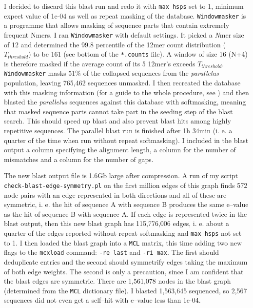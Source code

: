 \documentclass{article}\usepackage[]{graphicx}\usepackage[]{color}
\begin{document}
I decided to discard this blast run and redo it with \texttt{max\_hsps} set to 1, minimum expect value of 1e-04 as well as repeat masking of the database. \texttt{Windowmasker} \citep{Morgulis2006a} is a programme that allows masking of sequence parts that contain extremely frequent \glspl{Nmer}. I ran \texttt{Windowmasker} with default settings. It picked a \emph{N}mer size of 12 and determined the 99.8 percentile of the 12mer count distribution ($T_{threshold}$) to be 161 (see bottom of the \texttt{*.counts} file). A window of size 16 (N+4) is therefore masked if the average count of its 5 12mer's exceeds  $T_{threshold}$. \texttt{Windowmasker} masks 51\% of the collapsed sequences from the \textit{parallelus} population, leaving 765,462 sequences unmasked. I then recreated the database with this masking information (for a guide to the whole procedure, see \citealt{blast+_user_manual}) and then blasted the \textit{parallelus} sequences against this database with softmasking, meaning that masked sequence parts cannot take part in the seeding step of the blast search. This should speed up blast and also prevent blast hits among highly repetitive sequences. The parallel blast run is finished after 1h 34min (i. e. a quarter of the time when run without repeat softmasking). I included in the blast output a column specifying the alignment length, a column for the number of mismatches and a column for the number of gaps. 

The new blast output file is 1.6Gb large after compression. A run of my script \texttt{check-blast-edge-symmetry.pl} on the first million edges of this graph finds 572 node pairs with an edge represented in both directions and all of these are symmetric, i. e. the hit of sequence A with sequence B produces the same e--value as the hit of sequence B with sequence A. If each edge is represented twice in the blast output, then this new blast graph has  115,776,006  edges, i. e. about a quarter of the edges reported without repeat softmasking and \texttt{max\_hsps} not set to 1. I then loaded the blast graph into a \texttt{MCL} matrix, this time adding two new flags to the \texttt{mcxload} command: \texttt{-re last} and \texttt{-ri max}. The first should deduplicate entries and the second should symmetrify edges taking the maximum of both edge weights. The second is only a precaution, since I am confident that the blast edges are symmetric. There are 1,561,078 nodes in the blast graph (determined from the \texttt{MCL} dictionary file). I blasted 1,563,645 sequenced, so 2,567 sequences did not even get a self--hit with e--value less than 1e-04.
\end{document}
